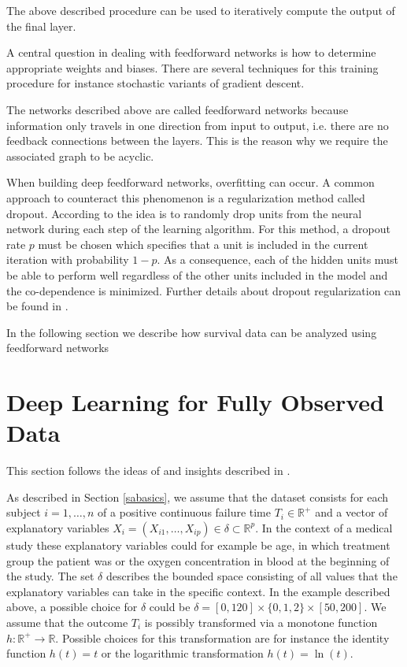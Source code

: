 \documentclass[12pt, a4paper]{scrartcl}
\theoremstyle{definition}
\theoremstyle{plain}
\numberwithin{equation}{section}
\numberwithin{figure}{section}
\numberwithin{table}{section}
\begin{document}
	The above described procedure can be used to iteratively compute the output of the final layer.
	
	A central question in dealing with feedforward networks is how to determine appropriate weights and biases.
	There are several techniques for this training procedure for instance stochastic variants of gradient descent.
	
	The networks described above are called feedforward networks because information only travels in one direction from input to output, i.e. there are no feedback connections between the layers.
	This is the reason why we require the associated graph to be acyclic.
	
	When building deep feedforward networks, overfitting can occur.
	A common approach to counteract this phenomenon is a regularization method called dropout.
	According to \citet*{dropout} the idea is to randomly drop units from the neural network during each step of the learning algorithm.
	For this method, a dropout rate $p$ must be chosen which specifies that a unit is included in the current iteration with probability $1-p$.
	As a consequence, each of the hidden units must be able to perform well regardless of the other units included in the model and the co-dependence is minimized.
	Further details about dropout regularization can be found in \citet*{dropout}.
	
	In the following section we describe how survival data can be analyzed using feedforward networks
	
	\newpage
	
	\section{Deep Learning for Fully Observed Data} \label{uncensored}
	This section follows the ideas of \citet*{basearticle} and insights described in \citet*{deeplbook}.
	
	As described in Section \ref{sabasics}, we assume that the dataset consists for each subject $i = 1,\dots,n$ of a positive continuous failure time $T_i \in \mathbb{R}^+$ and a vector of explanatory variables $X_i = (X_{i1}, \dots , X_{ip}) \in \delta \subset \mathbb{R}^p$.
	In the context of a medical study these explanatory variables could for example be age, in which treatment group the patient was or the oxygen concentration in blood at the beginning of the study.
	The set $\delta$ describes the bounded space consisting of all values that the explanatory variables can take in the specific context.
	In the example described above, a possible choice for $\delta$ could be $\delta = [0, 120] \times \{0,1,2\} \times [50, 200]$.
	We assume that the outcome $T_i$ is possibly transformed via a monotone function $h: \mathbb{R}^+ \rightarrow \mathbb{R}$.
	Possible choices for this transformation are for instance the identity function $h(t)=t$ or the logarithmic transformation $h(t)= \ln (t)$.
	
\end{document}
